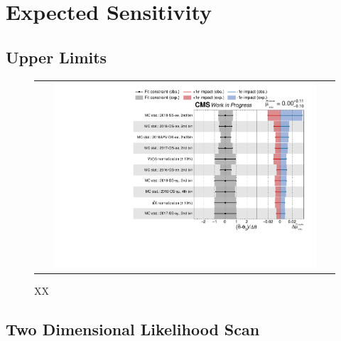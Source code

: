 \chapter{Expected Sensitivity}
\label{chap:Sensitivity}

\section{Upper Limits}

 \begin{figure}[tbh!]
 \begin{center}
 \begin{tabular}{c}
 \includegraphics[width=0.9\textwidth]{figures/Part4/Sensitivity/Impact}
 \end{tabular}
 \caption{XX}
 \label{fig:Impact_2}
 \end{center}
 \end{figure}

\section{Two Dimensional Likelihood Scan}

